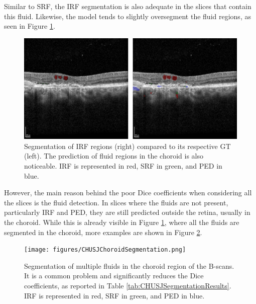 Similar to SRF, the IRF segmentation is also adequate in the slices that contain this fluid. Likewise, the model tends to slightly oversegment the fluid regions, as seen in Figure \ref{fig:CHUSJIRFSegmentation}. 

\begin{figure}[!ht]
	\centering
	\includegraphics[width=0.60\linewidth]{figures/CHUSJIRFSegmentation.png}
	\caption{Segmentation of IRF regions (right) compared to its respective GT (left). The prediction of fluid regions in the choroid is also noticeable. IRF is represented in red, SRF in green, and PED in blue.}
	\label{fig:CHUSJIRFSegmentation}
\end{figure}

However, the main reason behind the poor Dice coefficients when considering all the slices is the fluid detection. In slices where the fluids are not present, particularly IRF and PED, they are still predicted outside the retina, usually in the choroid. While this is already visible in Figure \ref{fig:CHUSJIRFSegmentation}, where all the fluids are segmented in the choroid, more examples are shown in Figure \ref{fig:CHUSJChoroidSegmentation}.

\begin{figure}[!ht]
	\centering	\texttt{[image: figures/CHUSJChoroidSegmentation.png]}
	\caption{Segmentation of multiple fluids in the choroid region of the B-scans. It is a common problem and significantly reduces the Dice coefficients, as reported in Table \ref{tab:CHUSJSegmentationResults}. IRF is represented in red, SRF in green, and PED in blue.}
	\label{fig:CHUSJChoroidSegmentation}
\end{figure}

